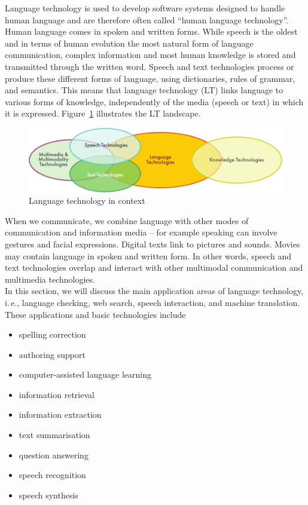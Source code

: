 \documentclass[]{../../metanetpaper}
\begin{document}
\begin{multicols}{2}

Language technology is used to develop software systems designed to handle human language and are therefore often called “human language technology”. Human language comes in spoken and written forms. While speech is the oldest and in terms of human evolution the most natural form of language communication, complex information and most human knowledge is stored and transmitted through the written word. Speech and text technologies process or produce these different forms of language, using dictionaries, rules of grammar, and semantics. This means that language technology (LT) links language to various forms of knowledge, independently of the media (speech or text) in which it is expressed. Figure~\ref{fig:ltincontext_en} illustrates the LT landscape.

\begin{figure}[htb]
  \center
  \includegraphics[width=\textwidth]{../_media/english/language_technologies}
  \caption{Language technology in context}
  \label{fig:ltincontext_en}
\end{figure}

When we communicate, we combine language with other modes of communication and information media – for example speaking can involve gestures and facial expressions. Digital texts link to pictures and sounds. Movies may contain language in spoken and written form. In other words, speech and text technologies overlap and interact with other multimodal communication and multimedia technologies.\\
In this section, we will discuss the main application areas of language technology, i.\,e., language checking, web search, speech interaction, and machine translation. These applications and basic technologies include

\begin{itemize}
\item spelling correction
\item authoring support
\item computer-assisted language learning
\item information retrieval
\item information extraction
\item text summarisation
\item question answering
\item speech recognition
\item speech synthesis
\end{itemize}


\end{multicols}
\end{document}
